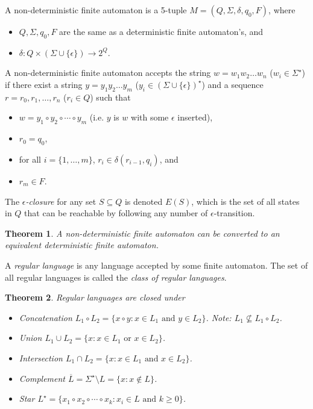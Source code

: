 \documentclass[letterpaper,landscape,11pt]{article}
\newtheorem{theorem}{Theorem}
\begin{document}
 A non-deterministic finite automaton is a 5-tuple $M = (Q, \Sigma, \delta, q_0, F)$, where
 \begin{itemize}
	\item $Q, \Sigma, q_0, F$ are the same as a deterministic finite automaton's, and
	\item $\delta : Q \times (\Sigma \cup \{\epsilon\}) \rightarrow 2^Q$.
 \end{itemize}

 A non-deterministic finite automaton accepts the string $w = w_1w_2 \dots w_n$ ($w_i \in \Sigma^\star$) if there exist a string $y = y_1y_2 \dots y_m$ ($y_i \in (\Sigma \cup \{\epsilon\})^\star$) and a sequence $r = r_0, r_1, \dots, r_n$ ($r_i \in Q$) such that
 \begin{itemize}
	\item $w = y_1 \circ y_2 \circ \cdots \circ y_m$ (i.e. $y$ is $w$ with some $\epsilon$ inserted),
	\item $r_0 = q_0$,
	\item for all $i = \{1, \dots, m\}$, $r_i \in \delta(r_{i-1}, q_i)$, and
	\item $r_m \in F$.
 \end{itemize}

 The \emph{$\epsilon$-closure} for any set $S \subseteq Q$ is denoted $E(S)$, which is the set of all states in $Q$ that can be reachable by following any number of $\epsilon$-transition.

 \begin{theorem}
	A non-deterministic finite automaton can be converted to an equivalent deterministic finite automaton.
 \end{theorem}

 A \emph{regular language} is any language accepted by some finite automaton. The set of all regular languages is called the \emph{class of regular languages}.

 \begin{theorem}
	Regular languages are closed under
	\begin{itemize}
		\item Concatenation $L_1 \circ L_2 = \{x \circ y : x \in L_1 \text{ and } y \in L_2\}$. Note: $L_1 \not\subseteq L_1 \circ L_2$.
		\item Union $L_1 \cup L_2 = \{x : x \in L_1 \text{ or } x \in L_2\}$.
		\item Intersection $L_1 \cap L_2 = \{x : x \in L_1 \text{ and } x \in L_2\}$.
		\item Complement $\overline{L} = \Sigma^\star \setminus L = \{x : x \notin L\}$.
		\item Star $L^\star = \{x_1 \circ x_2 \circ \cdots \circ x_k : x_i \in L \text{ and } k \geq 0\}$.
	\end{itemize}
 \end{theorem}
\end{document}
